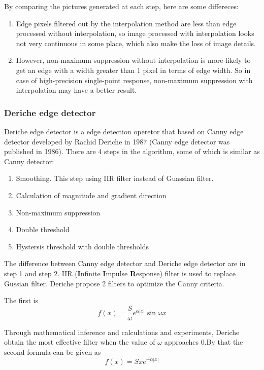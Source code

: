 \documentclass[10pt,twocolumn,letterpaper]{article}
\begin{document}
By comparing the pictures generated at each step, here are some differeces: 
\begin{enumerate}[noitemsep]
\item Edge pixels filtered out by the interpolation method are less than edge 
processed without interpolation, so image processed with interpolation looks not 
very continuous in some place, which also make the loss of image details. 
\item However, non-maximum suppression without interpolation is more likely to 
get an edge with a width greater than 1 pixel in terms of edge width. So in case 
of high-precision single-point response, non-maximum suppression with interpolation 
may have a better result. 
\end{enumerate}

\subsubsection{Deriche edge detector}

Deriche edge detector is a edge detection operetor that based on Canny edge detector 
developed by Rachid Deriche in 1987 (Canny edge detector was published in 1986). 
There are 4 steps in the algorithm, some of which is similar as Canny detector: 
\begin{enumerate}[noitemsep]
\item Smoothing. This step using IIR filter instead of Guassian filter. 
\item Calculation of magnitude and gradient direction
\item Non-maximum suppression
\item Double threshold
\item Hystersis threshold with double thresholds
\end{enumerate}

The difference between Canny edge detector and Deriche edge detector are in step 1 
and step 2. IIR ({\bf I}nfinite {\bf I}mpulse {\bf R}esponse) filter is used to 
replace Gussian filter. Deriche propose 2 filters\cite{ref12} to optimize the Canny 
criteria. 

The first is 
$$
f(x) = \frac{S}{\omega} e^{\alpha |x|} \sin{\omega x}
$$

Through mathematical inference and calculations and experiments\cite{ref12}, Deriche 
obtain the most effective filter when the value of $\omega$ approaches 0.By that 
the second formula can be given as 
$$
f(x) = Sxe^{-\alpha |x|}
$$
\end{document}
